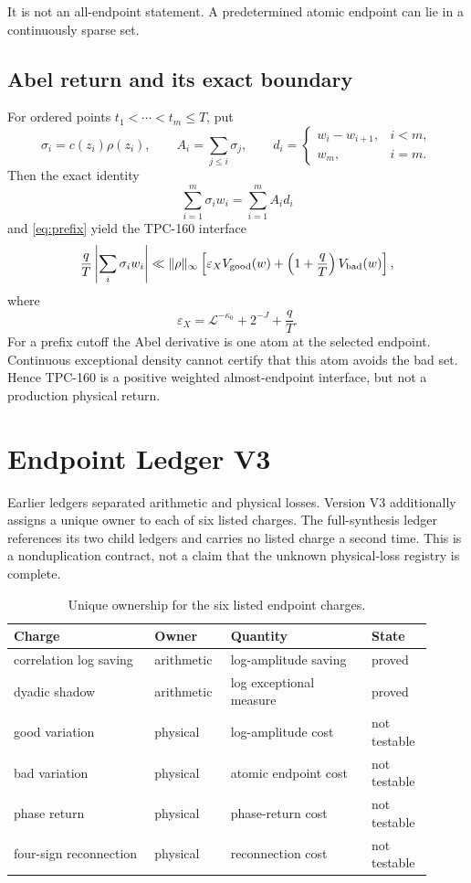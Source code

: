 \documentclass[11pt]{article}
\theoremstyle{definition}
\newcommand{\cL}{\mathcal L}
\newcommand{\eps}{\varepsilon}
\begin{document}
It is not an all-endpoint statement.  A predetermined atomic endpoint
can lie in a continuously sparse set.

\subsection{Abel return and its exact boundary}

For ordered points \(t_1<\cdots<t_m\le T\), put
\[
 \sigma_i=c(z_i)\rho(z_i),\qquad
 A_i=\sum_{j\le i}\sigma_j,\qquad
 d_i=
 \begin{cases}
   w_i-w_{i+1},&i<m,\\
   w_m,&i=m.
 \end{cases}
\]
Then the exact identity
\[
 \sum_{i=1}^m\sigma_iw_i=\sum_{i=1}^mA_id_i
\]
and \eqref{eq:prefix} yield the TPC-160 interface
\begin{equation}
 \frac qT\left|\sum_i\sigma_iw_i\right|
 \ll \|\rho\|_\infty
 \left[
   \eps_X V_{\rm good}(w)
   +\left(1+\frac qT\right)V_{\rm bad}(w)
 \right],                                                     \label{eq:abel}
\end{equation}
where
\[
 \eps_X=\cL^{-\kappa_0}+2^{-J}+\frac qT.
\]
For a prefix cutoff the Abel derivative is one atom at the selected
endpoint.  Continuous exceptional density cannot certify that this
atom avoids the bad set.  Hence TPC-160 is a positive weighted
almost-endpoint interface, but not a production physical return.

\section{Endpoint Ledger V3}

Earlier ledgers separated arithmetic and physical losses.  Version
V3 additionally assigns a unique owner to each of six listed charges.
The full-synthesis ledger references its two child ledgers and carries
no listed charge a second time.  This is a nonduplication contract,
not a claim that the unknown physical-loss registry is complete.

\begin{table}[ht]
\centering
\small
\begin{tabular}{@{}p{0.31\linewidth}p{0.16\linewidth}p{0.31\linewidth}p{0.13\linewidth}@{}}
\toprule
Charge & Owner & Quantity & State\\
\midrule
correlation log saving & arithmetic & log-amplitude saving & proved\\
dyadic shadow & arithmetic & log exceptional measure & proved\\
good variation & physical & log-amplitude cost & not testable\\
bad variation & physical & atomic endpoint cost & not testable\\
phase return & physical & phase-return cost & not testable\\
four-sign reconnection & physical & reconnection cost & not testable\\
\bottomrule
\end{tabular}
\caption{Unique ownership for the six listed endpoint charges.}
\label{tab:ledger}
\end{table}
\end{document}
